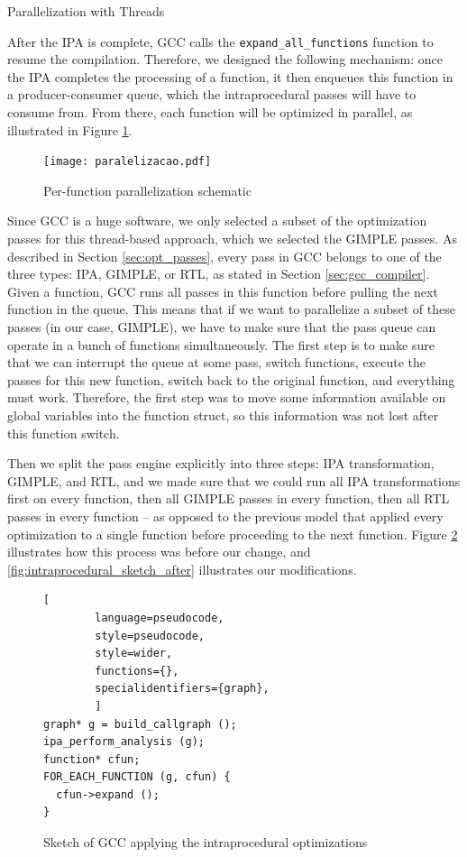 \begin{section}{Parallelization with Threads}\label{sec:threads}

After the IPA is complete, GCC calls the \texttt{expand\_all\_functions} function
to resume the compilation. Therefore, we designed the following mechanism: once
the IPA completes the processing of a function, it then enqueues this function
in a producer-consumer queue, which the intraprocedural passes will have to
consume from. From there, each function will be optimized in parallel, as
illustrated in Figure \ref{fig:paralelizacao}.


\begin{figure}[ht]
 \centering
 \texttt{[image: paralelizacao.pdf]}
 \caption{Per-function parallelization schematic}
 \label{fig:paralelizacao}
\end{figure}

Since GCC is a huge software, we only selected a subset of the optimization
passes for this thread-based approach, which we selected the GIMPLE passes.  As
described in Section \ref{sec:opt_passes}, every pass in GCC belongs to one of
the three types: IPA, GIMPLE, or RTL, as stated in Section
\ref{sec:gcc_compiler}. Given a function, GCC runs all passes in this function
before pulling the next function in the queue. This means that if we want to
parallelize a subset of these passes (in our case, GIMPLE), we have to make
sure that the pass queue can operate in a bunch of functions simultaneously.
The first step is to make sure that we can interrupt the queue at some pass,
switch functions, execute the passes for this new function, switch back to the
original function, and everything must work.  Therefore, the first step was to
move some information available on global variables into the function struct,
so this information was not lost after this function switch.

Then we split the pass engine explicitly into three steps: IPA
transformation, GIMPLE, and RTL, and we made sure that we could run all IPA
transformations first on every function, then all GIMPLE passes in every
function, then all RTL passes in every function -- as opposed to the previous
model that applied every optimization to a single function before proceeding to
the next function. Figure \ref{fig:intraprocedural_sketch} illustrates how this
process was before our change, and \ref{fig:intraprocedural_sketch_after}
illustrates our modifications.

\begin{figure}[ht]
	\centering
	\begin{lstlisting}[
		language=pseudocode,
		style=pseudocode,
		style=wider,
		functions={},
		specialidentifiers={graph},
		]
graph* g = build_callgraph ();
ipa_perform_analysis (g);
function* cfun;
FOR_EACH_FUNCTION (g, cfun) {
  cfun->expand ();
}
	\end{lstlisting}
\caption{Sketch of GCC applying the intraprocedural optimizations}
\label{fig:intraprocedural_sketch}
\end{figure}



\end{section}
